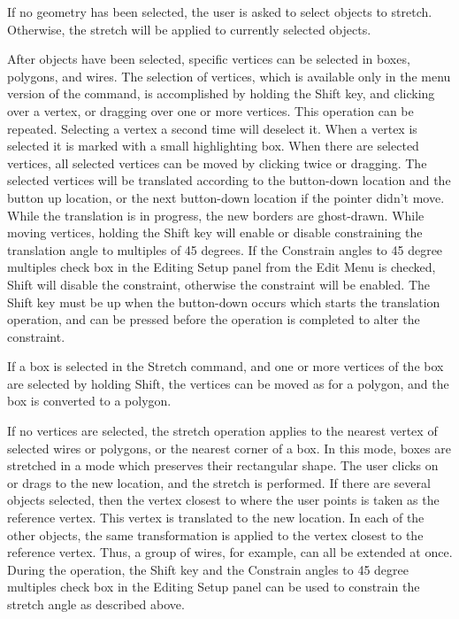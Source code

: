 If no geometry has been selected, the user is asked to select objects
to stretch.  Otherwise, the stretch will be applied to currently
selected objects.

After objects have been selected, specific vertices can be selected in
boxes, polygons, and wires.  The selection of vertices, which is
available only in the menu version of the command, is accomplished by
holding the {\kb Shift} key, and clicking over a vertex, or dragging
over one or more vertices.  This operation can be repeated.  Selecting
a vertex a second time will deselect it.  When a vertex is selected it
is marked with a small highlighting box.  When there are selected
vertices, all selected vertices can be moved by clicking twice or
dragging.  The selected vertices will be translated according to the
button-down location and the button up location, or the next
button-down location if the pointer didn't move.  While the
translation is in progress, the new borders are ghost-drawn.  While
moving vertices, holding the {\kb Shift} key will enable or disable
constraining the translation angle to multiples of 45 degrees.  If the
{\cb Constrain angles to 45 degree multiples} check box in the {\cb
Editing Setup} panel from the {\cb Edit Menu} is checked, {\kb Shift}
will disable the constraint, otherwise the constraint will be enabled. 
The {\kb Shift} key must be up when the button-down occurs which
starts the translation operation, and can be pressed before the
operation is completed to alter the constraint.

If a box is selected in the {\cb Stretch} command, and one or more
vertices of the box are selected by holding {\kb Shift}, the vertices
can be moved as for a polygon, and the box is converted to a polygon.

If no vertices are selected, the stretch operation applies to the
nearest vertex of selected wires or polygons, or the nearest corner of
a box.  In this mode, boxes are stretched in a mode which preserves
their rectangular shape.  The user clicks on or drags to the new
location, and the stretch is performed.  If there are several objects
selected, then the vertex closest to where the user points is taken as
the reference vertex.  This vertex is translated to the new location. 
In each of the other objects, the same transformation is applied to
the vertex closest to the reference vertex.  Thus, a group of wires,
for example, can all be extended at once.  During the operation, the
{\kb Shift} key and the {\cb Constrain angles to 45 degree multiples}
check box in the {\cb Editing Setup} panel can be used to constrain
the stretch angle as described above.

